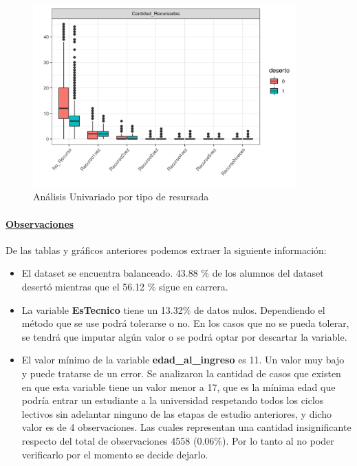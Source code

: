 \begin{figure}[!htb]
	\centering
	\includegraphics[width=0.9\textwidth]{imagenes/imagenes/gg_explo_tablon_tipo_recur.png}
	\caption{Análisis Univariado por tipo de resursada}
	\label{fig:tablon_boxplot_tipoRecursada}
\end{figure}

\clearpage

\hypertarget{observaciones}{%
	\paragraph{\textbf{\underline{Observaciones}}}\label{observaciones}}

De las tablas y gráficos anteriores podemos extraer la siguiente
información:

\begin{itemize}
	\item
	El dataset se encuentra balanceado. 43.88 \% de los alumnos del
	dataset desertó mientras que el 56.12 \% sigue en carrera.
	\item
	La variable \textbf{EsTecnico} tiene un 13.32\% de datos nulos.
	Dependiendo el método que se use podrá tolerarse o no. En los casos
	que no se pueda tolerar, se tendrá que imputar algún valor o se podrá
	optar por descartar la variable.
	\item
	El valor mínimo de la variable \textbf{edad\_al\_ingreso} es 11. Un
	valor muy bajo y puede tratarse de un error. Se analizaron la cantidad
	de casos que existen en que esta variable tiene un valor menor a 17,
	que es la mínima edad que podría entrar un estudiante a la universidad
	respetando todos los ciclos lectivos sin adelantar ninguno de las
	etapas de estudio anteriores, y dicho valor es de 4 observaciones. Las
	cuales representan una cantidad insignificante respecto del total de
	observaciones 4558 (0.06\%). Por lo tanto al no poder verificarlo por
	el momento se decide dejarlo.
\end{itemize}

